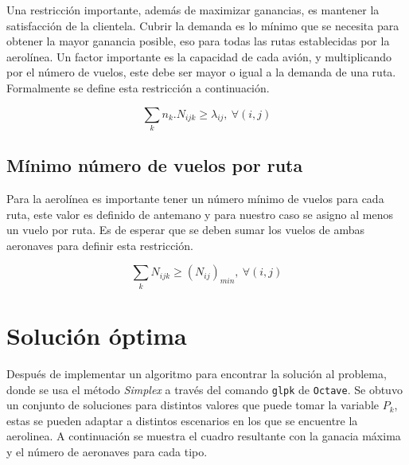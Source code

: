\documentclass[12pt]{article}
\begin{document}
Una restricción importante, además de maximizar ganancias, es mantener la satisfacción de la clientela. Cubrir la demanda es lo mínimo que se necesita para obtener la mayor ganancia posible, eso para todas las rutas establecidas por la aerolínea. Un factor importante es la capacidad de cada avión, y multiplicando por el número de vuelos, este debe ser mayor o igual a la demanda de una ruta. Formalmente se define esta restricción a continuación.

\begin{equation}
    \sum_{k} n_{k}.N_{ijk} \geq \lambda_{ij},\ \forall (i,j)
\end{equation}

\subsection{Mínimo número de vuelos por ruta}

Para la aerolínea es importante tener un número mínimo de vuelos para cada ruta, este valor es definido de antemano y para nuestro caso se asigno al menos un vuelo por ruta. Es de esperar que se deben sumar los vuelos de ambas aeronaves para definir esta restricción.

\begin{equation}
    \sum_{k} N_{ijk} \geq (N_{ij})_{min},\ \forall (i,j)
\end{equation}

\section{Solución óptima}

Después de implementar un algoritmo para encontrar la solución al problema, donde se usa el método \emph{Simplex} a través del comando \texttt{glpk} de \texttt{Octave}. Se obtuvo un conjunto de soluciones para distintos valores que puede tomar la variable $P_{k}$, estas se pueden adaptar a distintos escenarios en los que se encuentre la aerolinea. A continuación se muestra el cuadro resultante con la ganacia máxima y el número de aeronaves para cada tipo.
\end{document}

